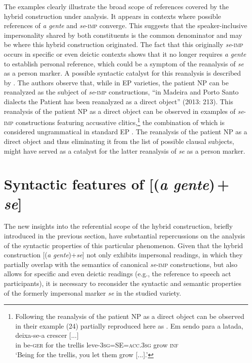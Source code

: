\documentclass[output=paper]{langscibook}
\begin{document}
The examples clearly illustrate the broad scope of references covered by the hybrid construction under analysis. It appears in contexts where possible references of \textit{a gente} and \textit{se}-\textsc{imp} converge. This suggests that the speaker-inclusive impersonality shared by both constituents is the common denominator and may be where this hybrid construction originated. The fact that this originally \textit{se}-\textsc{imp} occurs in specific or even deictic contexts shows that it no longer requires \textit{a gente} to establish personal reference, which could be a symptom of the reanalysis of \textit{se} as a person marker. A possible syntactic catalyst for this reanalysis is described by \citet{PosioVilkuna2013}. The authors observe that, while in EP varieties, the patient NP can be reanalyzed as the subject of \textit{se}-\textsc{imp} constructions, “in Madeira and Porto Santo dialects the Patient has been reanalyzed as a direct object” (2013: 213). This reanalysis of the patient NP as a direct object can be observed in examples of \textit{se}-\textsc{imp} constructions featuring accusative clitics,\footnote{Following \citet[214]{PosioVilkuna2013} the reanalysis of the patient NP as a direct object can be observed in their example (24) partially reproduced here as .
\ea \label{ex:henriques:fn15-1}
\gll Em sendo para a latada, deixa-se-a crescer [...]\\
    in be-\textsc{ger} for the trellis leve-\textsc{3sg}=SE=\textsc{acc.3sg} {grow \textsc{inf}}\\
\glt `Being for the trellis, you let them grow [...].'
\z}
the combination of which is considered ungrammatical in standard EP \citep[786]{Naro1976}. The reanalysis of the patient NP as a direct object and thus eliminating it from the list of possible clausal subjects, might have served as a catalyst for the latter reanalysis of \textit{se} as a person marker. 

\section{Syntactic features of [(\textit{a gente})\,+\,\textit{se}]}\label{sec:henriques:5}

The new insights into the referential scope of the hybrid construction, briefly introduced in the previous section, have substantial repercussions on the analysis of the syntactic properties of this particular phenomenon. Given that the hybrid construction [(\textit{a gente})+\textit{se}] not only exhibits impersonal readings, in which they partially overlap with the semantics of canonical \textit{se}-\textsc{imp} constructions, but also allows for specific and even deictic readings (e.g., the reference to speech act participants), it is necessary to reconsider the syntactic and semantic properties of the formerly impersonal marker \textit{se} in the studied variety.
\end{document}

